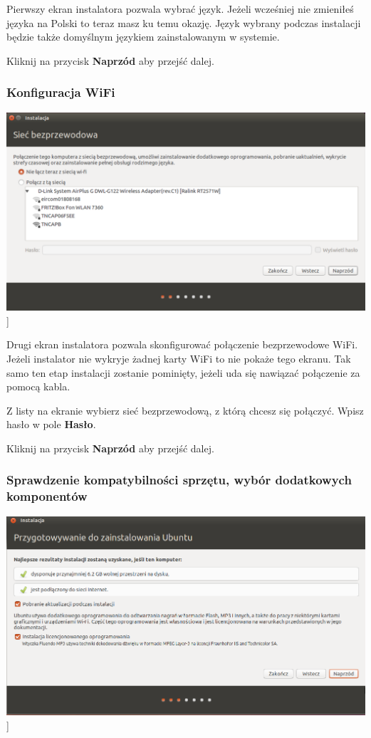 Pierwszy ekran instalatora pozwala wybrać język. Jeżeli wcześniej nie zmieniłeś języka na Polski to teraz masz ku temu okazję. Język wybrany podczas instalacji będzie także domyślnym językiem zainstalowanym w systemie.
\begin{flushright}
Kliknij na przycisk \textbf{Naprzód} aby przejść dalej.
\end{flushright}
\clearpage
\subsubsection{Konfiguracja WiFi}
\begin{center}
        \includegraphics[scale=0.5]{images/instalator_wifi.png}]
\end{center}

Drugi ekran instalatora pozwala skonfigurować połączenie bezprzewodowe WiFi. Jeżeli instalator nie wykryje żadnej karty WiFi to nie pokaże tego ekranu. Tak samo ten etap instalacji zostanie pominięty, jeżeli uda się nawiązać połączenie za pomocą kabla.

Z listy na ekranie wybierz sieć bezprzewodową, z którą chcesz się połączyć. Wpisz hasło w pole \textbf{Hasło}.
\begin{flushright}
Kliknij na przycisk \textbf{Naprzód} aby przejść dalej.
\end{flushright}
\clearpage
\subsubsection{Sprawdzenie kompatybilności sprzętu, wybór dodatkowych komponentów}
\begin{center}
        \includegraphics[scale=0.5]{images/instalator_wymagania.png}]
\end{center}

